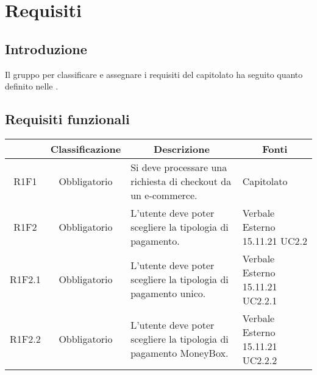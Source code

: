 \section{Requisiti} \label{section:requisiti}

\subsection{Introduzione}
Il gruppo \groupName{} per classificare e assegnare i requisiti del capitolato ha seguito quanto definito nelle \docNameVersionNdP{}.

\subsection{Requisiti funzionali} \label{subsection:requisiti_funzionali}
\begin{table}[H]
    \centering
    \renewcommand{\arraystretch}{1.8}
    \begin{tabular}{c | c | p{6cm} | p{4.1cm}}
        \rowcolor[HTML]{125E28}
        \multicolumn{1}{c}{\color[HTML]{FFFFFF} \textbf{Codice}}          &
        \multicolumn{1}{c}{\color[HTML]{FFFFFF} \textbf{Classificazione}} &
        \multicolumn{1}{c}{\color[HTML]{FFFFFF} \textbf{Descrizione}}     &
        \multicolumn{1}{c}{\color[HTML]{FFFFFF} \textbf{Fonti}}                                                                                                                                                                 \\
        \hline
        R1F1                                                              & Obbligatorio & Si deve processare una richiesta di checkout da un e-commerce\glo{}.                             & Capitolato                        \\
        R1F2                                                              & Obbligatorio & L'utente deve poter scegliere la tipologia di pagamento.                                         & Verbale Esterno 15.11.21 UC2.2    \\
        R1F2.1                                                            & Obbligatorio & L'utente deve poter scegliere la tipologia di pagamento unico.                                   & Verbale Esterno 15.11.21 UC2.2.1  \\
        R1F2.2                                                            & Obbligatorio & L'utente deve poter scegliere la tipologia di pagamento MoneyBox\glo{}.                          & Verbale Esterno 15.11.21 UC2.2.2  \\

\end{tabular}
\end{table}
